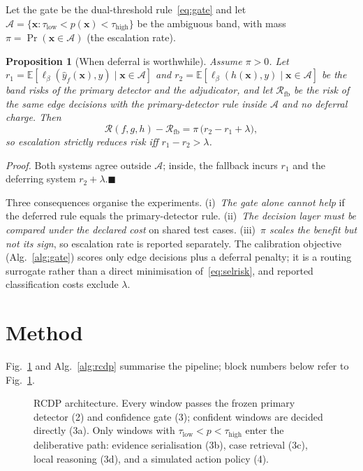 \documentclass[journal]{IEEEtran}
\newtheorem{proposition}{Proposition}
\newcommand{\proofpar}[1]{\par\noindent\textit{Proof.} #1\hfill$\blacksquare$\par\medskip}
\begin{document}
Let the gate be the dual-threshold rule~\eqref{eq:gate} and let $\mathcal{A}=\{\mathbf{x}:\tau_{\mathrm{low}}<p(\mathbf{x})<\tau_{\mathrm{high}}\}$ be the ambiguous band, with mass $\pi=\Pr(\mathbf{x}\in\mathcal{A})$ (the escalation rate).

\begin{proposition}[When deferral is worthwhile]
\label{prop:defer}
Assume $\pi>0$. Let $r_1=\mathbb{E}[\ell_\beta(\hat{y}_f(\mathbf{x}),y)\mid\mathbf{x}\in\mathcal{A}]$ and $r_2=\mathbb{E}[\ell_\beta(h(\mathbf{x}),y)\mid\mathbf{x}\in\mathcal{A}]$ be the band risks of the primary detector and the adjudicator, and let $\mathcal{R}_{\mathrm{fb}}$ be the risk of the same edge decisions with the primary-detector rule inside $\mathcal{A}$ and no deferral charge. Then
\begin{equation}
\mathcal{R}(f,g,h)-\mathcal{R}_{\mathrm{fb}}=\pi\,\big(r_2-r_1+\lambda\big),
\label{eq:deferdelta}
\end{equation}
so escalation strictly reduces risk iff $r_1-r_2>\lambda$.
\end{proposition}
\proofpar{Both systems agree outside $\mathcal{A}$; inside, the fallback incurs $r_1$ and the deferring system $r_2+\lambda$.}

Three consequences organise the experiments. (i)~\emph{The gate alone cannot
help} if the deferred rule equals the primary-detector rule. (ii)~\emph{The
decision layer must be compared under the declared cost} on shared test cases.
(iii)~\emph{$\pi$ scales the benefit but not its sign}, so escalation rate is
reported separately. The calibration objective (Alg.~\ref{alg:gate}) scores
only edge decisions plus a deferral penalty; it is a routing surrogate rather
than a direct minimisation of~\eqref{eq:selrisk}, and reported classification
costs exclude $\lambda$.

\section{Method}
\label{sec:method}

Fig.~\ref{fig:arch} and Alg.~\ref{alg:rcdp} summarise the pipeline; block numbers below refer to Fig.~\ref{fig:arch}.

\begin{figure}[!t]
\centering
\resizebox{\linewidth}{!}{}
\caption{RCDP architecture. Every window passes the frozen primary detector (2)
and confidence gate (3); confident windows are decided directly (3a). Only
windows with $\tau_{\mathrm{low}}<p<\tau_{\mathrm{high}}$ enter the
deliberative path: evidence serialisation (3b), case retrieval (3c), local
reasoning (3d), and a simulated action policy (4).}
\label{fig:arch}
\end{figure}
\end{document}
